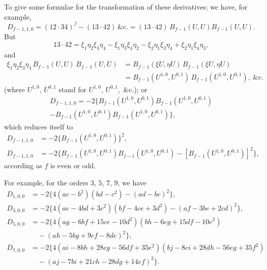 \documentclass[12pt,a4paper]{article}
\begin{document}
To give some formulae for the transformation of these derivatives; we have, for
example,
\[
D_{f-1,1,0} = (12\cdot 34)^f - (13\cdot 42)\,\&\text{c.} = (13\cdot 42)\, B_{f-1}(U, U) B_{f-1}(U, U).
\]
But
\[
13\cdot 42 = \xi_1\eta_2\xi_3\eta_4 - \xi_1\eta_3\xi_4\eta_2 - \xi_2\eta_1\xi_3\eta_4 + \xi_2\eta_1\xi_4\eta_3,
\]
and
\begin{align*}
\xi_1\eta_2\xi_3\eta_4\, B_{f-1}(U, U)\, B_{f-1}(U, U)
&= B_{f-1}(\xi U, \eta U)\, B_{f-1}(\xi U, \eta U)\\
&= B_{f-1}(U^{1,0}, U^{0,1})\, B_{f-1}(U^{1,0}, U^{0,1}),\ \&\text{c.}
\end{align*}
(where $U^{1,0}$, $U^{0,1}$ stand for $U^{1,0}$, $U^{0,1}$,\ \&c.); or
\begin{multline*}
D_{f-1,1,0} = -2\{B_{f-1}(U^{1,0}, U^{0,1}) B_{f-1}(U^{1,0}, U^{0,1})\\
- B_{f-1}(U^{1,0}, U^{0,1}) B_{f-1}(U^{1,0}, U^{0,1})\},
\end{multline*}
which reduces itself to
\begin{align*}
D_{f-1,1,0} &= -2\{B_{f-1}(U^{1,0}, U^{0,1})\}^2,\\
D_{f-1,1,0} &= -2\{B_{f-1}(U^{1,0}, U^{0,1}) B_{f-1}(U^{1,0}, U^{0,1})
- [B_{f-1}(U^{1,0}, U^{0,1})]^2\},
\end{align*}
according as $f$ is even or odd.

\newpage
\setcounter{page}{107}

For example, for the orders $3$, $5$, $7$, $9$, we have
\begin{align*}
D_{1,0,0} &= -2\{4(ac-b^2)(bd-c^2) - (ad-bc)^2\},\\
D_{3,0,0} &= -2\{4(ae-4bd+3c^2)(bf-4ce+3d^2) - (af-3be+2cd)^2\},\\
D_{5,0,0} &= -2\{4(ag-6bf+15ce-10d^2)(bh-6cg+15df-10e^2)\\
&\quad - (ah-5bg+9cf-8de)^2\},\\
D_{7,0,0} &= -2\{4(ai-8bh+28cg-56df+35e^2)(bj-8ci+28dh-56eg+35f^2)\\
&\quad - (aj-7bi+21ch-28dg+14ef)^2\}.
\end{align*}
\end{document}
